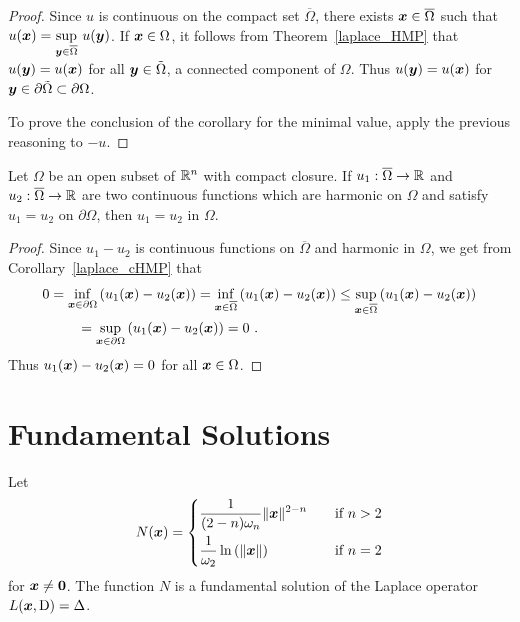 \begin{proof}
Since $u$ is continuous on the compact set $\overline{\Omega}$, there
exists ${\bm{x}}\in \overline{\Omega}$ such that
$\displaystyle u({\bm{x}}) = \sup_{{\bm{y}}\in \overline{\Omega}}\, u({\bm{y}})$.
If ${\bm{x}} \in \Omega$, it follows from Theorem~\ref{laplace_HMP}
that $u({\bm{y}}) = u({\bm{x}})$ for all ${\bm{y}} \in \tilde{\Omega}$, a
connected component of $\Omega$.  Thus $u({\bm{y}}) = u({\bm{x}})$ for
${\bm{y}} \in \partial \tilde{\Omega} \subset \partial \Omega$.

To prove the conclusion of the corollary for the minimal value, apply
the previous reasoning to $-u$.
\end{proof}

\begin{theorem} \label{laplace_uniqu_th}
Let $\Omega$ be an open subset of $\mathbb{R}^n$ with compact closure.  If
$u_1 : \overline{\Omega} \rightarrow \mathbb{R}$ and
$u_2 : \overline{\Omega} \rightarrow \mathbb{R}$ are two continuous functions
which are harmonic on $\Omega$ and satisfy $u_1 = u_2$ on $\partial \Omega$, 
then $u_1 = u_2$ in $\Omega$.
\end{theorem}

\begin{proof}
Since $u_1-u_2$ is continuous functions on
$\overline{\Omega}$ and harmonic in $\Omega$, we get from
Corollary~\ref{laplace_cHMP} that
\begin{align*}
0 &= \inf_{{\bm{x}}\in \partial \Omega} \left(u_1({\bm{x}}) - u_2({\bm{x}})\right)
= \inf_{{\bm{x}}\in \overline{\Omega}} \left(u_1({\bm{x}}) - u_2({\bm{x}})\right)
\leq \sup_{{\bm{x}}\in \overline{\Omega}} \left(u_1({\bm{x}}) -
u_2({\bm{x}})\right) \\
& \qquad
= \sup_{{\bm{x}}\in \partial \Omega} \left(u_1({\bm{x}}) - u_2({\bm{x}})\right)
= 0 \ .
\end{align*}
Thus $\displaystyle u_1({\bm{x}}) - u_2({\bm{x}}) = 0$ for all
${\bm{x}} \in \Omega$.
\end{proof}

\section{Fundamental Solutions}

\begin{theorem} \label{laplace_fund_sol}
Let
\[
N({\bm{x}}) =
\begin{cases}
\displaystyle \frac{1}{(2-n)\omega_n} \|{\bm{x}}\|^{2-n} & \quad 
\text{if} \ n>2 \\[0.9em]
\displaystyle \frac{1}{\omega_2} \ln\left(\|{\bm{x}}\|\right) & \quad 
\text{if} \ n=2
\end{cases}
\]
for ${\bm{x}} \neq {\bm{0}}$.  The function $N$ is a fundamental
solution of the Laplace operator $L({\bm{x}},\operatorname{D}) = \Delta$.
\end{theorem}

